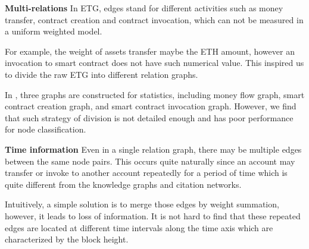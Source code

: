 \textbf{Multi-relations} In ETG, edges stand for different activities such as money transfer, contract creation and contract invocation, which can not be measured in a uniform weighted model.

For example, the weight of assets transfer maybe the ETH amount, however an invocation to smart contract does not have such numerical value. This inspired us to divide the raw ETG into different relation graphs.

In \cite{chen2018infocom}, three graphs are constructed for statistics, including money flow graph, smart contract creation graph, and smart contract invocation graph. However, we find that such strategy of division is not detailed enough and has poor performance for node classification.





\textbf{Time information} Even in a single relation graph, there may be multiple edges between the same node pairs. This occurs quite naturally since an account may transfer or invoke to another account repeatedly for a period of time which is quite different from the knowledge graphs and citation networks.

Intuitively, a simple solution is to merge those edges by weight summation, however, it leads to loss of information. It is not hard to find that these repeated edges are located at different time intervals along the time axis which are characterized by the block height.

